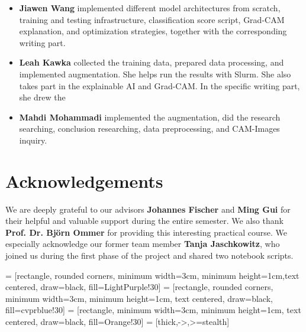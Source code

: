 \begin{itemize}
  \item \textbf{Jiawen Wang} implemented different model architectures from scratch, 
  training and testing infrastructure, classification score script, Grad-CAM explanation, and optimization strategies, 
  together with the corresponding writing part. 
  \item \textbf{Leah Kawka} collected the training data, prepared data processing, and implemented augmentation. 
  She helps run the results with Slurm. 
  She also takes part in the explainable AI and Grad-CAM. 
  In the specific writing part, she drew the %
  \item \textbf{Mahdi Mohammadi} implemented the augmentation, did the research searching, conclusion researching, data preprocessing, and CAM-Images inquiry.
\end{itemize}

\section*{Acknowledgements}

We are deeply grateful to our advisors \textbf{Johannes Fischer} and \textbf{Ming Gui} for their helpful and valuable support during the entire semester. 
We also thank \textbf{Prof. Dr. Björn Ommer} for providing this interesting practical course. 
We especially acknowledge our former team member \textbf{Tanja Jaschkowitz}, 
who joined us during the first phase of the project and shared two notebook scripts.

 = [rectangle, rounded corners, minimum width=3cm, minimum height=1cm,text centered, draw=black, fill=LightPurple!30]
 = [rectangle, rounded corners, minimum width=3cm, minimum height=1cm, text centered, draw=black, fill=cvprblue!30]
 = [rectangle, minimum width=3cm, minimum height=1cm, text centered, draw=black, fill=Orange!30]
 = [thick,->,>=stealth]

